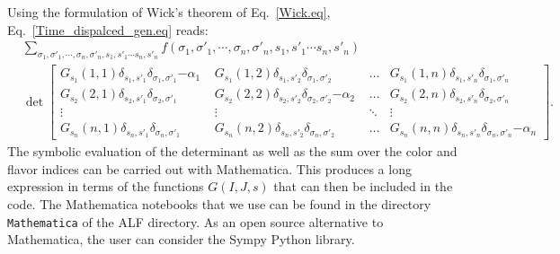 Using the formulation of Wick's theorem of Eq.~\eqref{Wick.eq},  Eq.~\eqref{Time_dispalced_gen.eq}  reads: 
\begin{align}
	& \sum_{\sigma_1, \sigma'_1, \cdots, \sigma_n, \sigma'_n,  s_1, s'_1  \cdots s_n,  s'_n  }  f( \sigma_1, \sigma'_1, \cdots, \sigma_n, \sigma'_n,  s_1, s'_1  \cdots s_n,  s'_n ) 
	\\
	& \det  
\begin{bmatrix}
   G_{s_1}(1,1) \delta_{s_1,s'_1} \delta_{\sigma_1,\sigma'_1}  {- \alpha_1} & 
   G_{s_1}(1,2) \delta_{s_1,s'_2} \delta_{\sigma_1,\sigma'_2}   \phantom{ - \alpha_1}         &\! \dots  \!    &   
   G_{s_1}(1,n) \delta_{s_1,s'_n} \delta_{\sigma_1,\sigma'_n}   \phantom{ - \alpha_1} \\
   G_{s_2}(2,1) \delta_{s_2,s'_1} \delta_{\sigma_2,\sigma'_1}  \phantom{ - \alpha_1} &   
   G_{s_2}(2,2) \delta_{s_2,s'_2} \delta_{\sigma_2,\sigma'_2}  {- \alpha_2}  & \! \dots  \! &
    G_{s_2}(2,n) \delta_{s_2,s'_n} \delta_{\sigma_2,\sigma'_n} \phantom{ - \alpha_2}  \\
    \vdots & \vdots & \!   \ddots  \!  & \vdots \\
    G_{s_n}(n,1) \delta_{s_n,s'_1} \delta_{\sigma_n,\sigma'_1}   \phantom{- \alpha_n} & 
    G_{s_n}(n,2) \delta_{s_n,s'_2} \delta_{\sigma_n,\sigma'_2}   \phantom{- \alpha_n} & \! \dots   \!  & 
    G_{s_n}(n,n) \delta_{s_n,s'_n} \delta_{\sigma_n,\sigma'_n}   {- \alpha_n } 
 \end{bmatrix}.   \nonumber 
\end{align}
The  symbolic evaluation of the  determinant   as well as the sum over the color and flavor indices can be carried out with Mathematica.  This  produces a  long expression in terms of the   functions $G(I,J,s)$ that can then be  included in the code.   The Mathematica notebooks  that we use  can be found in the directory  \texttt{Mathematica}  of  the ALF  directory.   As an open source alternative to Mathematica, the user can consider the Sympy Python library. 
